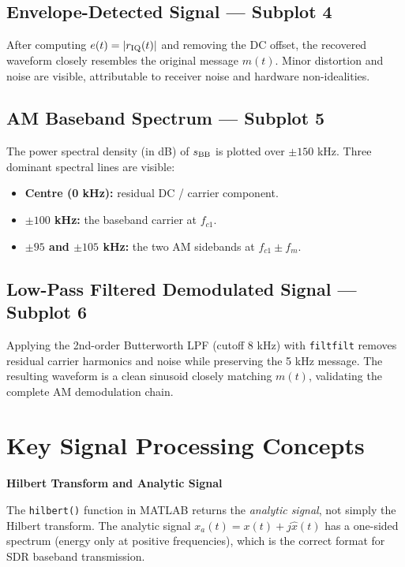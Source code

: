 \documentclass[12pt,a4paper]{article}
\begin{document}
\subsection{Envelope-Detected Signal — Subplot 4}

After computing $e(t)=|r_{\rm IQ}(t)|$ and removing the DC offset, the
recovered waveform closely resembles the original message $m(t)$.  Minor
distortion and noise are visible, attributable to receiver noise and hardware
non-idealities.

\subsection{AM Baseband Spectrum — Subplot 5}

The power spectral density (in dB) of $s_{\rm BB}$ is plotted over $\pm 150$ kHz.
Three dominant spectral lines are visible:
\begin{itemize}
  \item \textbf{Centre (0 kHz):} residual DC / carrier component.
  \item \textbf{$\pm 100$ kHz:} the baseband carrier at $f_{c1}$.
  \item \textbf{$\pm 95$ and $\pm 105$ kHz:} the two AM sidebands at
        $f_{c1} \pm f_m$.
\end{itemize}

\subsection{Low-Pass Filtered Demodulated Signal — Subplot 6}

Applying the 2nd-order Butterworth LPF (cutoff 8 kHz) with \texttt{filtfilt}
removes residual carrier harmonics and noise while preserving the 5 kHz message.
The resulting waveform is a clean sinusoid closely matching $m(t)$, validating
the complete AM demodulation chain.

\section{Key Signal Processing Concepts}

\begin{mdframed}[linecolor=blue!40, linewidth=1pt, roundcorner=6pt,
                  backgroundcolor=blue!3]
\textbf{Hilbert Transform and Analytic Signal}

The \texttt{hilbert()} function in MATLAB returns the \emph{analytic signal},
not simply the Hilbert transform.  The analytic signal
$x_a(t) = x(t) + j\hat{x}(t)$ has a one-sided spectrum (energy only at positive
frequencies), which is the correct format for SDR baseband transmission.
\end{mdframed}
\end{document}
